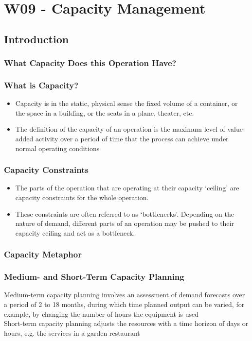 \section{W09 - Capacity Management}
\subsection{Introduction}
\subsubsection{What Capacity Does this Operation Have?}
\subsubsection{What is Capacity? }
\begin{itemize}
	\item Capacity is in the static, physical sense the fixed volume of a container,
	or the space in a building, or the seats in a plane, theater, etc.
	\item The definition of the capacity of an operation is the maximum level of
	value-added activity over a period of time that the process can achieve
	under normal operating conditions
\end{itemize}
\subsubsection{Capacity Constraints}
\begin{itemize}
	\item The parts of the operation that are operating at their capacity ‘ceiling’
	are capacity constraints for the whole operation.
	\item These constraints are often referred to as ‘bottlenecks’. Depending on
	the nature of demand, different parts of an operation may be pushed to
	their capacity ceiling and act as a bottleneck.
\end{itemize}
\subsubsection{Capacity Metaphor }
\subsubsection{Medium- and Short-Term Capacity Planning}
Medium-term capacity planning involves an
assessment of demand forecasts over a period of 2 to
18 months, during which time planned output can be
varied, for example, by changing the number of hours
the equipment is used \\
Short-term capacity planning adjusts the resources
with a time horizon of days or hours, e.g. the services
in a garden restaurant
